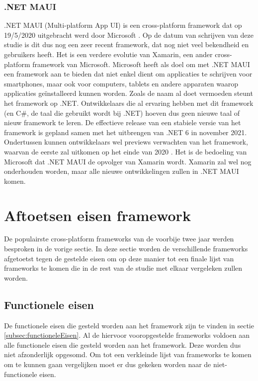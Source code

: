 \subsubsection{.NET MAUI}
\label{subsubsec:.NETMAUI}

.NET MAUI (Multi-platform App UI) is een cross-platform framework dat op 19/5/2020 uitgebracht werd door Microsoft \autocite{Hunter2020}. Op de datum van schrijven van deze studie is dit dus nog een zeer recent framework, dat nog niet veel bekendheid en gebruikers heeft. Het is een verdere evolutie van Xamarin, een ander cross-platform framework van Microsoft. Microsoft heeft als doel om met .NET MAUI een framework aan te bieden dat niet enkel dient om applicaties te schrijven voor smartphones, maar ook voor computers, tablets en andere apparaten waarop applicaties geïnstalleerd kunnen worden. Zoals de naam al doet vermoeden steunt het framework op .NET. Ontwikkelaars die al ervaring hebben met dit framework (en C\#, de taal die gebruikt wordt bij .NET) hoeven dus geen nieuwe taal of nieuw framework te leren. De effectieve release van een stabiele versie van het framework is gepland samen met het uitbrengen van .NET 6 in november 2021. Ondertussen kunnen ontwikkelaars wel previews verwachten van het framework, waarvan de eerste zal uitkomen op het einde van 2020 \autocite{Suarez2020}. Het is de bedoeling van Microsoft dat .NET MAUI de opvolger van Xamarin wordt. Xamarin zal wel nog onderhouden worden, maar alle nieuwe ontwikkelingen zullen in .NET MAUI komen.

\section{Aftoetsen eisen framework}
\label{sec:aftoetsenEisen}

De populairste cross-platform frameworks van de voorbije twee jaar werden besproken in de vorige sectie. In deze sectie worden de verschillende frameworks afgetoetst tegen de gestelde eisen om op deze manier tot een finale lijst van frameworks te komen die in de rest van de studie met elkaar vergeleken zullen worden.

\subsection{Functionele eisen}
\label{subsec:aftoetstenFunctioneleEisen}

De functionele eisen die gesteld worden aan het framework zijn te vinden in sectie \ref{subsec:functioneleEisen}. Al de hiervoor vooropgestelde frameworks voldoen aan alle functionele eisen die gesteld worden aan het framework. Deze worden dus niet afzonderlijk opgesomd. Om tot een verkleinde lijst van frameworks te komen om te kunnen gaan vergelijken moet er dus gekeken worden naar de niet-functionele eisen.

